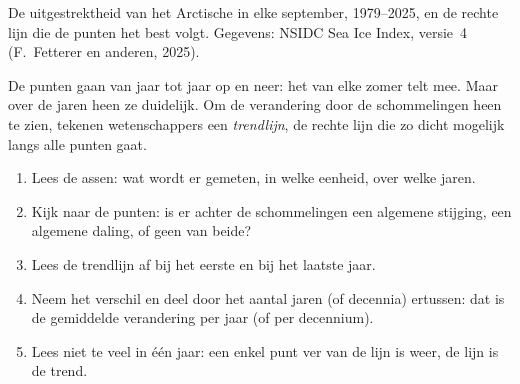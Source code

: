 \begin{omfigure}

{\small De uitgestrektheid van het Arctische  in elke september,
1979--2025, en de rechte lijn die de punten het best volgt. Gegevens:
NSIDC Sea Ice Index, versie~4 (F.~Fetterer en anderen, 2025).}
\label{fig:g8:ice-on-earth:sea-ice}
\end{omfigure}

De punten gaan van jaar tot jaar op en neer: het  van elke zomer telt
mee. Maar over de jaren heen  ze duidelijk. Om de verandering door de
schommelingen heen te zien, tekenen wetenschappers een \emph{trendlijn},
de rechte lijn die zo dicht mogelijk langs alle punten gaat.

\begin{method}
\begin{enumerate}
  \item Lees de assen: wat wordt er gemeten, in welke eenheid, over welke
        jaren.
  \item Kijk naar de punten: is er achter de schommelingen een algemene
        stijging, een algemene daling, of geen van beide?
  \item Lees de trendlijn af bij het eerste en bij het laatste jaar.
  \item Neem het verschil en deel door het aantal jaren (of decennia)
        ertussen: dat is de gemiddelde verandering per jaar (of per
        decennium).
  \item Lees niet te veel in één jaar: een enkel punt ver van de lijn is
        weer, de lijn is de trend.
\end{enumerate}
\end{method}

